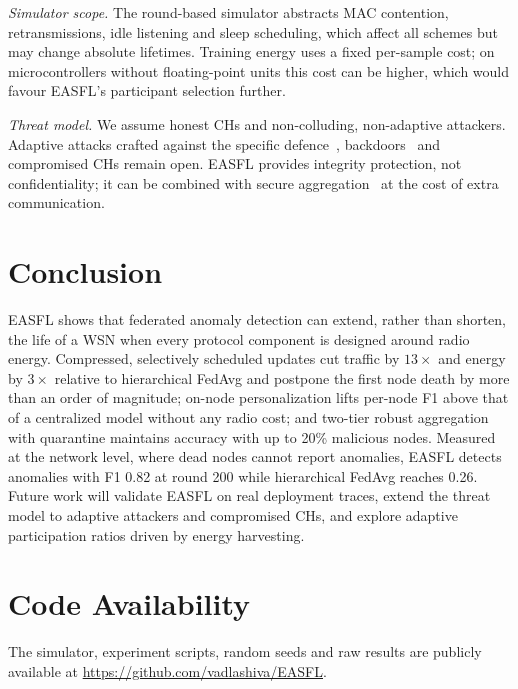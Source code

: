 \documentclass[journal]{IEEEtran}
\begin{document}
\textit{Simulator scope.} The round-based simulator abstracts MAC contention, retransmissions, idle listening and sleep scheduling, which affect all schemes but may change absolute lifetimes. Training energy uses a fixed per-sample cost; on microcontrollers without floating-point units this cost can be higher, which would favour EASFL's participant selection further.

\textit{Threat model.} We assume honest CHs and non-colluding, non-adaptive attackers. Adaptive attacks crafted against the specific defence~\cite{fang2020}, backdoors~\cite{bagdasaryan2020} and compromised CHs remain open. EASFL provides integrity protection, not confidentiality; it can be combined with secure aggregation~\cite{bonawitz2017} at the cost of extra communication.

\section{Conclusion}
EASFL shows that federated anomaly detection can extend, rather than shorten, the life of a WSN when every protocol component is designed around radio energy. Compressed, selectively scheduled updates cut traffic by $13\times$ and energy by $3\times$ relative to hierarchical FedAvg and postpone the first node death by more than an order of magnitude; on-node personalization lifts per-node F1 above that of a centralized model without any radio cost; and two-tier robust aggregation with quarantine maintains accuracy with up to 20\% malicious nodes. Measured at the network level, where dead nodes cannot report anomalies, EASFL detects anomalies with F1 0.82 at round 200 while hierarchical FedAvg reaches 0.26. Future work will validate EASFL on real deployment traces, extend the threat model to adaptive attackers and compromised CHs, and explore adaptive participation ratios driven by energy harvesting.

\section*{Code Availability}
The simulator, experiment scripts, random seeds and raw results are publicly available at \url{https://github.com/vadlashiva/EASFL}.



\end{document}
